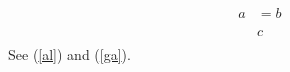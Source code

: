 \documentclass{article}
\begin{document}
\begin{align}
a &= b \\
\label{al}
\end{align}
\begin{gather}
c \\
\label{ga}
\end{gather}
See (\ref{al}) and (\ref{ga}).
\end{document}
